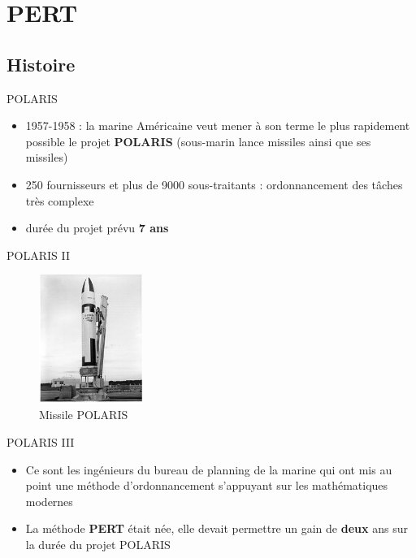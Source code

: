 \documentclass{beamer}
\begin{document}
  


\section{PERT}

\subsection{Histoire}

\begin{frame}{POLARIS}
  \begin{itemize}
    \item 1957-1958 : la marine Américaine veut mener à son terme le plus rapidement possible le projet \textbf{POLARIS} (sous-marin lance missiles ainsi que ses missiles)
    \item 250 fournisseurs et plus de 9000 sous-traitants : ordonnancement des tâches très complexe
    \item durée du projet prévu \textbf{7 ans}
\end{itemize}
\end{frame}

\begin{frame}{POLARIS II}
\begin{figure}
      \centering
      \includegraphics[width=0.3\textwidth]{missile}
      \caption{Missile POLARIS}
\end{figure}
\end{frame}

\begin{frame}{POLARIS III}
\begin{itemize}
    \item Ce sont les ingénieurs du bureau de planning de la marine qui ont mis au point une méthode d'ordonnancement s'appuyant sur les mathématiques modernes
    \item La méthode \textbf{PERT} était née, elle devait permettre un gain de \textbf{deux} ans sur la durée du projet POLARIS
\end{itemize}
\end{frame}
\end{document}
